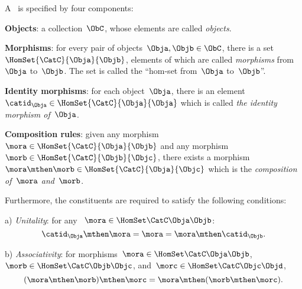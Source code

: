 \begin{ctdefinition}[Category]
  \label{def:categorymain}
  A \emph{}~\CatC is specified by four components:
  \begin{compactenum}
    \item \textbf{Objects}: a collection\footnotemark~$\ObC$, whose elements are called \emph{objects}.
    \item \textbf{Morphisms}: for every pair of objects~$\Obja,\Objb\in \ObC$, there is a set~$\HomSet{\CatC}{\Obja}{\Objb}$, elements of which are called
    \emph{morphisms} from~$\Obja$ to~$\Objb$. The set is called the ``hom-set from~$\Obja$ to~$\Objb$''.
    \item \textbf{Identity morphisms}: for each object~$\Obja$, there is
    an element~$\catid_{\Obja} \in \HomSet{\CatC}{\Obja}{\Obja}$ which is called \emph{the identity
    morphism of~$\Obja$}.
    \item \textbf{Composition rules}: given any morphism~${\mora} \in  \HomSet{\CatC}{\Obja}{\Objb}$ and any morphism~${\morb} \in \HomSet{\CatC}{\Objb}{\Objc}$, there exists a morphism~$\mora \mthen \morb\in \HomSet{\CatC}{\Obja}{\Objc}$ which is the \emph{composition of~$\mora$ and~$\morb$}.
  \end{compactenum}

  Furthermore, the constituents are required to satisfy the following conditions:
  \begin{compactenum}
    \item[a)] \emph{Unitality}: for any ~$\mora\in \HomSet\CatC\Obja\Objb$:
    \begin{equation}
      \catid_\Obja \mthen \mora= \mora = \mora \mthen \catid_\Objb.
    \end{equation}
    \item[b)] \emph{Associativity}: for morphisms~$\mora\in \HomSet\CatC\Obja\Objb$,~$\morb\in \HomSet\CatC\Objb\Objc$, and~$\morc\in \HomSet\CatC\Objc\Objd$,
    \begin{equation}
    (\mora\mthen \morb)
      \mthen \morc= \mora \mthen (\morb \mthen \morc).
    \end{equation}
  \end{compactenum}
\end{ctdefinition}



